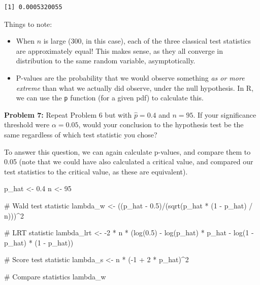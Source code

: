 \documentclass[
  letterpaper,
  DIV=11,
  numbers=noendperiod]{scrreprt}
\newenvironment{Shaded}{\begin{snugshade}}{\end{snugshade}}
\newcommand{\CommentTok}[1]{\textcolor[rgb]{0.37,0.37,0.37}{#1}}
\newcommand{\DecValTok}[1]{\textcolor[rgb]{0.68,0.00,0.00}{#1}}
\newcommand{\FloatTok}[1]{\textcolor[rgb]{0.68,0.00,0.00}{#1}}
\newcommand{\FunctionTok}[1]{\textcolor[rgb]{0.28,0.35,0.67}{#1}}
\newcommand{\NormalTok}[1]{\textcolor[rgb]{0.00,0.23,0.31}{#1}}
\newcommand{\OtherTok}[1]{\textcolor[rgb]{0.00,0.23,0.31}{#1}}
\newcommand{\SpecialCharTok}[1]{\textcolor[rgb]{0.37,0.37,0.37}{#1}}
\begin{document}
\begin{verbatim}
[1] 0.0005320055
\end{verbatim}

Things to note:

\begin{itemize}
\item
  When \(n\) is large (300, in this case), each of the three classical
  test statistics are approximately equal! This makes sense, as they all
  converge in distribution to the same random variable, asymptotically.
\item
  P-values are the probability that we would observe something \emph{as
  or more extreme} than what we actually did observe, under the null
  hypothesis. In R, we can use the \texttt{p} function (for a given pdf)
  to calculate this.
\end{itemize}

\textbf{Problem 7:} Repeat Problem 6 but with \(\hat{p} = 0.4\) and
\(n = 95\). If your significance threshold were \(\alpha = 0.05\), would
your conclusion to the hypothesis test be the same regardless of which
test statistic you chose?

To answer this question, we can again calculate p-values, and compare
them to 0.05 (note that we could have also calculated a critical value,
and compared our test statistics to the critical value, as these are
equivalent).

\begin{Shaded}
\begin{Highlighting}[]
\NormalTok{p\_hat }\OtherTok{\textless{}{-}} \FloatTok{0.4}
\NormalTok{n }\OtherTok{\textless{}{-}} \DecValTok{95}

\CommentTok{\# Wald test statistic}
\NormalTok{lambda\_w }\OtherTok{\textless{}{-}}\NormalTok{ ((p\_hat }\SpecialCharTok{{-}} \FloatTok{0.5}\NormalTok{)}\SpecialCharTok{/}\NormalTok{(}\FunctionTok{sqrt}\NormalTok{(p\_hat }\SpecialCharTok{*}\NormalTok{ (}\DecValTok{1} \SpecialCharTok{{-}}\NormalTok{ p\_hat) }\SpecialCharTok{/}\NormalTok{ n)))}\SpecialCharTok{\^{}}\DecValTok{2}

\CommentTok{\# LRT statistic}
\NormalTok{lambda\_lrt }\OtherTok{\textless{}{-}} \SpecialCharTok{{-}}\DecValTok{2} \SpecialCharTok{*}\NormalTok{ n }\SpecialCharTok{*}\NormalTok{ (}\FunctionTok{log}\NormalTok{(}\FloatTok{0.5}\NormalTok{) }\SpecialCharTok{{-}} \FunctionTok{log}\NormalTok{(p\_hat) }\SpecialCharTok{*}\NormalTok{ p\_hat }\SpecialCharTok{{-}} \FunctionTok{log}\NormalTok{(}\DecValTok{1} \SpecialCharTok{{-}}\NormalTok{ p\_hat) }\SpecialCharTok{*}\NormalTok{ (}\DecValTok{1} \SpecialCharTok{{-}}\NormalTok{ p\_hat))}

\CommentTok{\# Score test statistic}
\NormalTok{lambda\_s }\OtherTok{\textless{}{-}}\NormalTok{ n }\SpecialCharTok{*}\NormalTok{ (}\SpecialCharTok{{-}}\DecValTok{1} \SpecialCharTok{+} \DecValTok{2} \SpecialCharTok{*}\NormalTok{ p\_hat)}\SpecialCharTok{\^{}}\DecValTok{2}

\CommentTok{\# Compare statistics}
\NormalTok{lambda\_w}
\end{Highlighting}
\end{Shaded}
\end{document}
